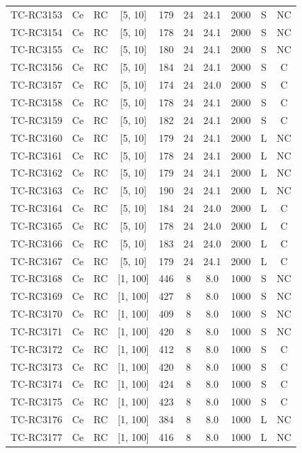 \begin{longtable}{lccccccccc}
TC-RC3153 & Ce & RC & [5, 10] & 179 & 24 & 24.1 & 2000 & S & NC \\
TC-RC3154 & Ce & RC & [5, 10] & 178 & 24 & 24.1 & 2000 & S & NC \\
TC-RC3155 & Ce & RC & [5, 10] & 180 & 24 & 24.1 & 2000 & S & NC \\
TC-RC3156 & Ce & RC & [5, 10] & 184 & 24 & 24.1 & 2000 & S & C \\
TC-RC3157 & Ce & RC & [5, 10] & 174 & 24 & 24.0 & 2000 & S & C \\
TC-RC3158 & Ce & RC & [5, 10] & 178 & 24 & 24.1 & 2000 & S & C \\
TC-RC3159 & Ce & RC & [5, 10] & 182 & 24 & 24.1 & 2000 & S & C \\
TC-RC3160 & Ce & RC & [5, 10] & 179 & 24 & 24.1 & 2000 & L & NC \\
TC-RC3161 & Ce & RC & [5, 10] & 178 & 24 & 24.1 & 2000 & L & NC \\
TC-RC3162 & Ce & RC & [5, 10] & 179 & 24 & 24.1 & 2000 & L & NC \\
TC-RC3163 & Ce & RC & [5, 10] & 190 & 24 & 24.1 & 2000 & L & NC \\
TC-RC3164 & Ce & RC & [5, 10] & 184 & 24 & 24.0 & 2000 & L & C \\
TC-RC3165 & Ce & RC & [5, 10] & 178 & 24 & 24.0 & 2000 & L & C \\
TC-RC3166 & Ce & RC & [5, 10] & 183 & 24 & 24.0 & 2000 & L & C \\
TC-RC3167 & Ce & RC & [5, 10] & 179 & 24 & 24.1 & 2000 & L & C \\
TC-RC3168 & Ce & RC & [1, 100] & 446 & 8 & 8.0 & 1000 & S & NC \\
TC-RC3169 & Ce & RC & [1, 100] & 427 & 8 & 8.0 & 1000 & S & NC \\
TC-RC3170 & Ce & RC & [1, 100] & 409 & 8 & 8.0 & 1000 & S & NC \\
TC-RC3171 & Ce & RC & [1, 100] & 420 & 8 & 8.0 & 1000 & S & NC \\
TC-RC3172 & Ce & RC & [1, 100] & 412 & 8 & 8.0 & 1000 & S & C \\
TC-RC3173 & Ce & RC & [1, 100] & 420 & 8 & 8.0 & 1000 & S & C \\
TC-RC3174 & Ce & RC & [1, 100] & 424 & 8 & 8.0 & 1000 & S & C \\
TC-RC3175 & Ce & RC & [1, 100] & 423 & 8 & 8.0 & 1000 & S & C \\
TC-RC3176 & Ce & RC & [1, 100] & 384 & 8 & 8.0 & 1000 & L & NC \\
TC-RC3177 & Ce & RC & [1, 100] & 416 & 8 & 8.0 & 1000 & L & NC \\

\end{longtable}
